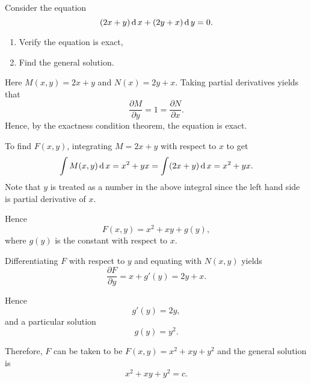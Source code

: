 \begin{exercise}
    Consider the equation
    \[(2x+y )\operatorname{d} x + (2y+ x ) \operatorname{d} y =0.\]
    \begin{enumerate}
      \item Verify the equation is exact,
      \item Find the general solution.
    \end{enumerate}
\end{exercise}
\begin{exersol}
  Here $M(x,y)=2x+y$ and $N(x)=2y+x$.
  Taking partial derivatives yields that
    \[\frac{\partial M}{\partial y}= 1 = \frac{\partial N}{\partial x}.\]
    Hence, by the exactness condition theorem, the equation is exact.

    To find $F(x,y)$, integrating $M=2x+y$ with respect to $x$ to get 
    \[\int M(x, y) \operatorname{d} x = x^2+ yx = \int (2x + y) \operatorname{d} x = x^2+ yx.\]
    Note that $y$ is treated as a number in the above integral since the left hand side is partial derivative of $x$. 
    
    Hence
    \[F(x, y)= x^2 + xy + g(y),\]
    where $g(y)$ is the constant with respect to $x$. 
    
    Differentiating $F$ with respect to $y$ and equating with $N(x, y)$ yields
    \[     
    \frac{\partial F}{\partial y} = x + g'(y) = 2y+x.
    \]

    Hence 
    \[
    g'(y) =2y,
    \]
    and a particular solution
    \[
    g(y)= y^2.
    \]

    Therefore, $F$ can be taken to be $F(x,y)= x^2+ xy + y^2$ and the general solution is
    \[
    x^2 + xy + y^2= c.
    \]
\end{exersol}
